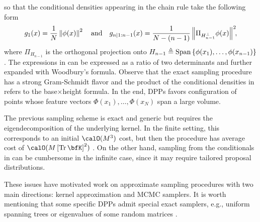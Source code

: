 \documentclass[twoside,11pt]{article}
\begin{document}
			\noindent
      so that the conditional densities appearing in the chain rule take the following form
      \begin{equation}
      \label{eq:conditionals_densities}
        g_1(x)
          = \frac{1}{N} \left\| \phi(x) \right\|^2
          \quad\text{and}\quad
        g_{n | 1:n-1}(x)
          = \frac{1}{N-(n-1)} \left\|  \Pi_{H_{n-1}^{\perp}} \phi(x) \right\|^2\!\!,
      \end{equation}
      where $\Pi_{H_{n-1}}$ is the orthogonal projection onto
      $H_{n-1} \triangleq \operatorname{Span}\left\{ \phi(x_1), \dots, \phi(x_{n-1})  \right\}$.
      The expressions in  can be expressed as a ratio of two determinants and further expanded with Woodbury's formula.
      Observe that the exact sampling procedure has a strong Gram-Schmidt flavor and the product of the conditional densities in  refers to the base$\times$height formula.
      In the end, DPPs favors configuration of points whose feature vectors $\Phi(x_1),\dots, \Phi(x_N)$ span a large volume.

      The previous sampling scheme is exact and generic but requires the eigendecomposition of the underlying kernel.
      In the finite setting, this corresponds to an initial $\calO(M^3)$ cost, but then the procedure has average cost of $\calO(M\lrb{\Tr \bfK}^2)$
      \citep{TrBaAm18}.
      On the other hand, sampling from the conditionals in  can be cumbersome in the infinite case, since it may require tailored proposal distributions.

      These issues have motivated work on approximate sampling procedures with two main directions: kernel approximation and MCMC samplers.
      It is worth mentioning that some specific DPPs admit special exact samplers, e.g., uniform spanning trees \citep{PrWi98} or eigenvalues of some random matrices \citep{DuEd02}.
\end{document}
